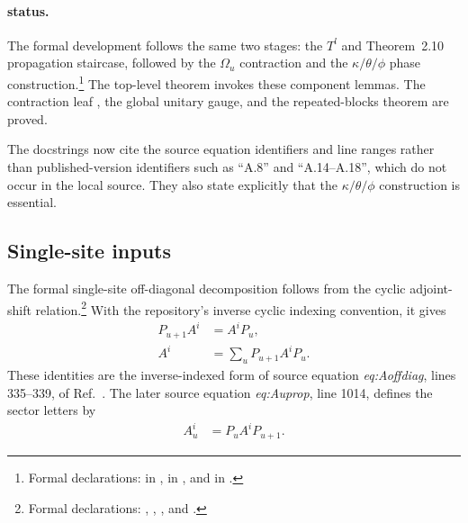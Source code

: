 \documentclass{article}
\begin{document}
\paragraph{\Lean{} status.}

The formal development follows the same two stages: the $T^l$ and
Theorem~2.10 propagation staircase, followed by the $\Omega_u$ contraction and
the $\kappa/\theta/\phi$ phase construction.\footnote{Formal declarations:
 in
,
 in
, and
 in
.} The top-level theorem invokes these
component lemmas. The contraction leaf
, the global unitary gauge,
and the repeated-blocks theorem are proved.

The docstrings now cite the source equation identifiers and line ranges rather
than published-version identifiers such as ``A.8'' and ``A.14--A.18'', which
do not occur in the local source. They also state explicitly that the
$\kappa/\theta/\phi$ construction is essential.

\subsection{Single-site inputs}

The formal single-site off-diagonal decomposition follows from the cyclic
adjoint-shift relation.\footnote{Formal declarations:
,
,
, and
.} With the repository's inverse
cyclic indexing convention, it gives
\begin{align}
    P_{u+1}A^i
    &=A^iP_u,
    \label{eq:dccsp17_periodic_overlap_route_alignment_single_site_shift}\\
    A^i
    &=\sum_u P_{u+1}A^iP_u.
    \label{eq:dccsp17_periodic_overlap_route_alignment_single_site_decomposition}
\end{align}
These identities are the inverse-indexed form of source equation
\emph{eq:Aoffdiag}, lines 335--339, of
Ref.~\cite{DeLasCuevas2017Irreducible}. The later source equation
\emph{eq:Auprop}, line 1014, defines the sector letters by
\begin{align}
    A_u^i
    &=P_uA^iP_{u+1}.
    \label{eq:dccsp17_periodic_overlap_route_alignment_sector_letter}
\end{align}
\end{document}
